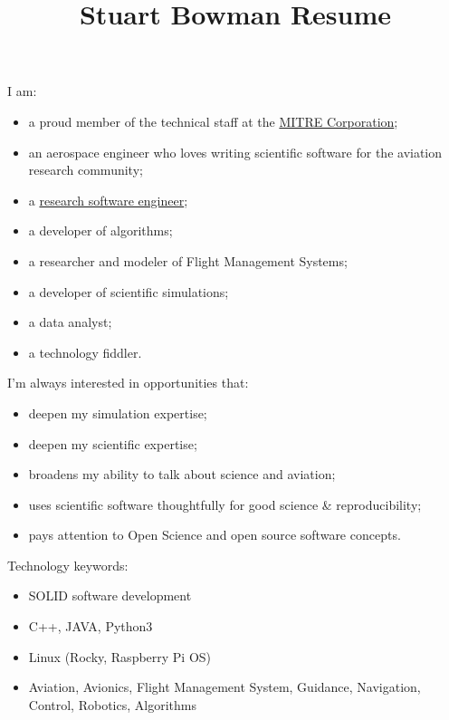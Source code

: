 \documentclass[
  letterpaper,
  DIV=11,
  numbers=noendperiod]{scrartcl}
\title{Stuart Bowman \textbar{} Resume}
\author{}
\date{}
\providecommand{\tightlist}{%
  \setlength{\itemsep}{0pt}\setlength{\parskip}{0pt}}\usepackage{longtable,booktabs,array}
\renewcommand*\contentsname{Table of contents}
\newcommand\contentsname{Table of contents}
\begin{document}
\maketitle

\renewcommand*\contentsname{Table of contents}
{
\hypersetup{linkcolor=}
\setcounter{tocdepth}{3}
\tableofcontents
}
I am:

\begin{itemize}
\tightlist
\item
  a proud member of the technical staff at the
  \href{https://www.mitre.org}{MITRE Corporation};
\item
  an aerospace engineer who loves writing scientific software for the
  aviation research community;
\item
  a \href{https://us-rse.org/}{research software engineer};
\item
  a developer of algorithms;
\item
  a researcher and modeler of Flight Management Systems;
\item
  a developer of scientific simulations;
\item
  a data analyst;
\item
  a technology fiddler.
\end{itemize}

I'm always interested in opportunities that:

\begin{itemize}
\tightlist
\item
  deepen my simulation expertise;
\item
  deepen my scientific expertise;
\item
  broadens my ability to talk about science and aviation;
\item
  uses scientific software thoughtfully for good science \&
  reproducibility;
\item
  pays attention to Open Science and open source software concepts.
\end{itemize}

Technology keywords:

\begin{itemize}
\tightlist
\item
  SOLID software development
\item
  C++, JAVA, Python3
\item
  Linux (Rocky, Raspberry Pi OS)
\item
  Aviation, Avionics, Flight Management System, Guidance, Navigation,
  Control, Robotics, Algorithms
\end{itemize}
\end{document}

